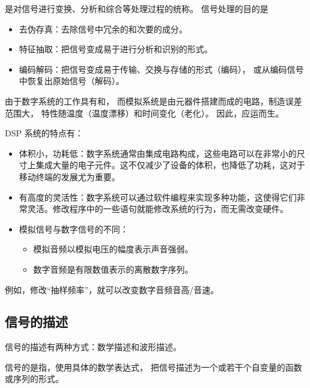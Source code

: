 \begin{definition}[信号处理]
    是对信号进行变换、分析和综合等处理过程的统称。
    信号处理的目的是
    \begin{itemize}
        \item 去伪存真：去除信号中冗余的和次要的成分。
        \item 特征抽取：把信号变成易于进行分析和识别的形式。
        \item 编码解码：把信号变成易于传输、交换与存储的形式（编码），
            或从编码信号中恢复出原始信号（解码）。
    \end{itemize}
\end{definition}

\begin{example}
    由于数字系统的工作具有和，
    而模拟系统是由元器件搭建而成的电路，制造误差范围大，
    特性随温度（温度漂移）和时间变化（老化）。
    因此，应运而生。

    DSP 系统的特点有：
    \begin{itemize}
        \item 体积小，功耗低：数字系统通常由集成电路构成，这些电路可以在非常小的尺寸上集成大量的电子元件。这不仅减少了设备的体积，也降低了功耗，这对于移动终端的发展尤为重要。
        \item 有高度的灵活性：数字系统可以通过软件编程来实现多种功能，这使得它们非常灵活。修改程序中的一些语句就能修改系统的行为，而无需改变硬件。
        \item 模拟信号与数字信号的不同：
            \begin{itemize}
                \item 模拟音频以模拟电压的幅度表示声音强弱。
                \item 数字音频是有限数值表示的离散数字序列。
            \end{itemize}
    \end{itemize}
    例如，修改“抽样频率”，就可以改变数字音频音高/音速。
\end{example}

\subsection{信号的描述}

信号的描述有两种方式：数学描述和波形描述。

\begin{definition}[数学描述]
    信号的是指，使用具体的数学表达式，
    把信号描述为一个或若干个自变量的函数或序列的形式。
\end{definition}

